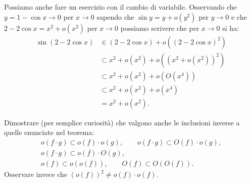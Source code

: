 \begin{example}
Possiamo anche fare un esercizio con il cambio di variabile.
Osservando che $y=1-\cos x\to 0$ per $x\to 0$
sapendo che $\sin y = y + o(y^2)$ per $y\to 0$
e che $2-2\cos x = x^2 + o(x^2)$ per $x\to 0$
possiamo scrivere
che per $x\to 0$ si ha:
\begin{align*}
\sin(2-2\cos x)
& \in (2-2\cos x) + o((2-2\cos x)^2) \\
& \subset x^2 + o(x^2) + o((x^2+o(x^2))^2) \\
& \subset x^2 + o(x^2) + o(O(x^4)) \\
& \subset x^2 + o(x^2) + o(x^4) \\
& = x^2 + o(x^2).
\end{align*}
\end{example}

\begin{exercise}
Dimostrare (per semplice curiosità) che valgono anche le inclusioni inverse 
a quelle enunciate nel teorema:
\begin{gather*}
o(f\cdot g) \subset o(f) \cdot o(g), \qquad
o(f\cdot g) \subset O(f) \cdot o(g), \\
o(f\cdot g) \subset o(f) \cdot O(g), \\
o(f) \subset o(o(f)),  \qquad
O(f) \subset O(O(f)).
\end{gather*}
Osservare invece che $(o(f))^2 \neq o(f)\cdot o(f)$.
\end{exercise}

